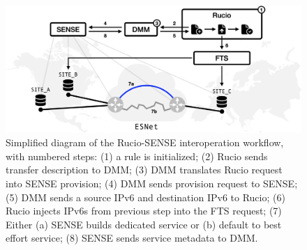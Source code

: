 
\begin{figure}[htb]
  \centering
  \includegraphics[width=.9\textwidth]{fig/cyber/rucio-sense_basic.png}
  \caption{
    Simplified diagram of the Rucio-SENSE interoperation workflow, with numbered steps: 
    (1) a rule is initialized; 
    (2) Rucio sends transfer description to DMM; 
    (3) DMM translates Rucio request into SENSE provision; 
    (4) DMM sends provision request to SENSE; 
    (5) DMM sends a source IPv6 and destination IPv6 to Rucio;
    (6) Rucio injects IPv6s from previous step into the FTS request;
    (7) Either (a) SENSE builds dedicated service or (b) default to best effort service; 
    (8) SENSE sends service metadata to DMM.
  }
  \label{fig:rucio_sense_basic}
\end{figure}

